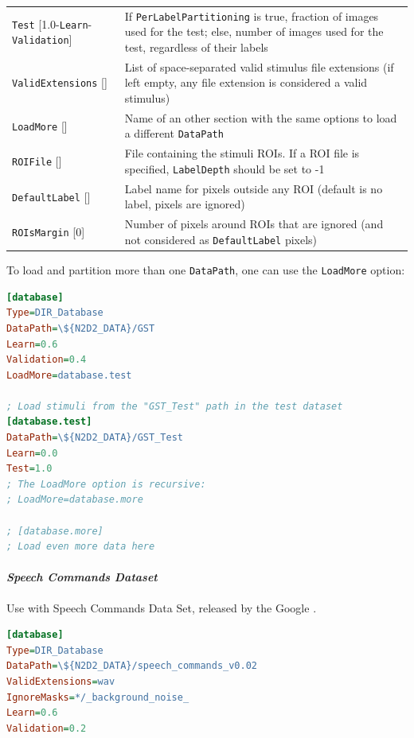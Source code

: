 \documentclass[a4paper,11pt,oneside]{article}
\begin{document}
\begin{center}
\begin{longtable}{| p{5cm} | p{10cm} | }
  \lstinline!Test! [1.0-\lstinline!Learn!-\lstinline!Validation!] & If
  \lstinline!PerLabelPartitioning! is true, fraction of images used for the
  test; else, number of images used for the test, regardless of their labels \\
  \lstinline!ValidExtensions! [] & List of space-separated valid stimulus file
  extensions (if left empty, any file extension is considered a valid stimulus)
  \\
  \lstinline!LoadMore! [] & Name of an other section with the same options to
  load a different \lstinline!DataPath! \\
 \hline
  \lstinline!ROIFile! [] & File containing the stimuli ROIs. If a ROI file is
   specified, \lstinline!LabelDepth! should be set to -1 \\
  \lstinline!DefaultLabel! [] & Label name for pixels outside any ROI (default
   is no label, pixels are ignored) \\
  \lstinline!ROIsMargin! [0] & Number of pixels around ROIs that are ignored
  (and not considered as \lstinline!DefaultLabel! pixels) \\
 \hline
\end{longtable}
\end{center}

To load and partition more than one \lstinline!DataPath!, one can use the
\lstinline!LoadMore! option:

\begin{lstlisting}[language=ini]
[database]
Type=DIR_Database
DataPath=\${N2D2_DATA}/GST
Learn=0.6
Validation=0.4
LoadMore=database.test

; Load stimuli from the "GST_Test" path in the test dataset
[database.test]
DataPath=\${N2D2_DATA}/GST_Test
Learn=0.0
Test=1.0
; The LoadMore option is recursive:
; LoadMore=database.more

; [database.more]
; Load even more data here
\end{lstlisting}


\paragraph{\emph{Speech Commands Dataset}}
Use with Speech Commands Data Set, released by the Google \citep{speechcommandsv2}.

\begin{lstlisting}[language=ini]
[database]
Type=DIR_Database
DataPath=\${N2D2_DATA}/speech_commands_v0.02
ValidExtensions=wav
IgnoreMasks=*/_background_noise_
Learn=0.6
Validation=0.2
\end{lstlisting}
\end{document}
